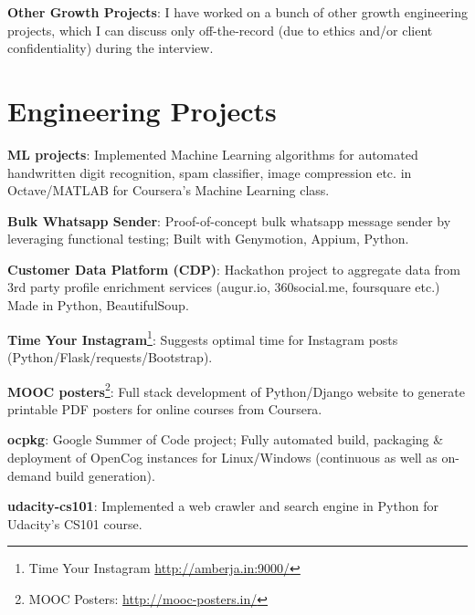 \documentclass[overlapped,centered]{resume}
\begin{document}
\begin{resume}
\begin{list2}
	\item \textbf{Other Growth Projects}: I have worked on a bunch of other growth engineering projects, which I can discuss only off-the-record (due to ethics and/or client confidentiality) during the interview.
	
	\end{list2}

    \section{\mysidestyle Engineering Projects} 
	\begin{list2}
	
	\item \textbf{ML projects}: Implemented Machine Learning algorithms for automated handwritten digit recognition, spam classifier, image compression etc. in Octave/MATLAB for Coursera's Machine Learning class.
	
	\item \textbf{Bulk Whatsapp Sender}: Proof-of-concept bulk whatsapp message sender by leveraging functional testing; Built with Genymotion, Appium, Python.
	
	\item \textbf{Customer Data Platform (CDP)}: Hackathon project to aggregate data from 3rd party profile enrichment services (augur.io, 360social.me, foursquare etc.) Made in Python, BeautifulSoup.
	
	\item \textbf{Time Your Instagram}\footnote{Time Your Instagram \url{http://amberja.in:9000/}}: Suggests optimal time for Instagram posts (Python/Flask/requests/Bootstrap).
	
	\item \textbf{MOOC posters}\footnote{MOOC Posters: \url{http://mooc-posters.in/}}: Full stack development of Python/Django website to generate printable PDF posters for online courses from Coursera.
	
	\item \textbf{ocpkg}: Google Summer of Code project; Fully automated build, packaging \& deployment of OpenCog instances for Linux/Windows (continuous as well as on-demand build generation).
	
	\item \textbf{udacity-cs101}: Implemented a web crawler and search engine in Python for Udacity's CS101 course.
	
    \end{list2}


\end{resume}
\end{document}
